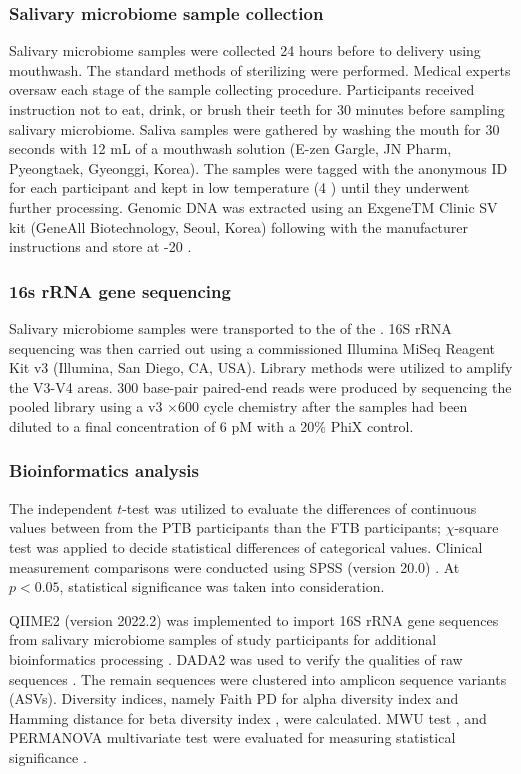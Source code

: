 \documentclass[11pt, a4paper, onecolumn, oneside]{report}
\begin{document}
            \subsubsection{Salivary microbiome sample collection}
                Salivary microbiome samples were collected 24 hours before to delivery using mouthwash. The standard methods of sterilizing were performed. Medical experts oversaw each stage of the sample collecting procedure. Participants received instruction not to eat, drink, or brush their teeth for 30 minutes before sampling salivary microbiome. Saliva samples were gathered by washing the mouth for 30 seconds with 12 mL of a mouthwash solution (E-zen Gargle, JN Pharm, Pyeongtaek, Gyeonggi, Korea). The samples were tagged with the anonymous ID for each participant and kept in low temperature (4 \textcelsius) until they underwent further processing. Genomic DNA was extracted using an ExgeneTM Clinic SV kit (GeneAll Biotechnology, Seoul, Korea) following with the manufacturer instructions and store at -20 \textcelsius.

            \subsubsection{16s rRNA gene sequencing}
                Salivary microbiome samples were transported to the of the . 16S rRNA sequencing was then carried out using a commissioned Illumina MiSeq Reagent Kit v3 (Illumina, San Diego, CA, USA). Library methods were utilized to amplify the V3-V4 areas. 300 base-pair paired-end reads were produced by sequencing the pooled library using a v3 $\times$600 cycle chemistry after the samples had been diluted to a final concentration of 6 pM with a 20\% PhiX control.

            \subsubsection{Bioinformatics analysis}
                The independent $t$-test was utilized to evaluate the differences of continuous values between from the PTB participants than the FTB participants; $\chi$-square test was applied to decide statistical differences of categorical values. Clinical measurement comparisons were conducted using SPSS (version 20.0) \cite{SPSS-1}. At $p < 0.05$, statistical significance was taken into consideration.

                QIIME2 (version 2022.2) was implemented to import 16S rRNA gene sequences from salivary microbiome samples of study participants for additional bioinformatics processing \cite{QIIME2-1}. DADA2 was used to verify the qualities of raw sequences \cite{DADA2-1}. The remain sequences were clustered into amplicon sequence variants (ASVs). Diversity indices, namely Faith PD for alpha diversity index \cite{FaithPD-1} and Hamming distance for beta diversity index \cite{Hamming-1}, were calculated. MWU test \cite{MWW-1}, and PERMANOVA multivariate test were evaluated for measuring statistical significance \cite{PERMANOVA-1, PERMANOVA-2}.
\end{document}
